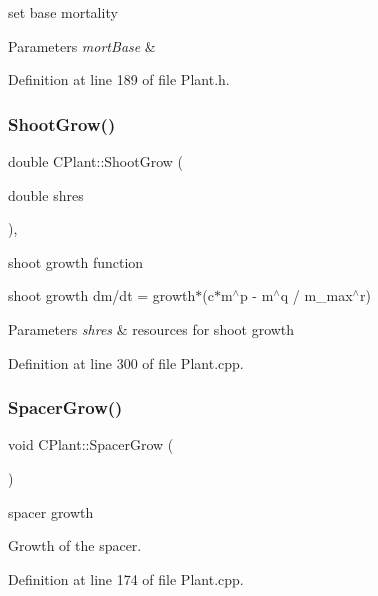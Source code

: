 set base mortality 
\begin{DoxyParams}{Parameters}
{\em mort\+Base} & \\
\hline
\end{DoxyParams}


Definition at line 189 of file Plant.\+h.

\mbox{\label{class_c_plant_a04fa48b79241a419192d035a3d28f839}} 
\subsubsection{\texorpdfstring{ShootGrow()}{ShootGrow()}}
{\footnotesize\ttfamily double C\+Plant\+::\+Shoot\+Grow (\begin{DoxyParamCaption}\item[{double}]{shres }\end{DoxyParamCaption})\hspace{0.3cm}{\ttfamily [protected]}, {\ttfamily [virtual]}}



shoot growth function 

shoot growth dm/dt = growth$\ast$(c$\ast$m$^\wedge$p -\/ m$^\wedge$q / m\+\_\+max$^\wedge$r) 
\begin{DoxyParams}{Parameters}
{\em shres} & resources for shoot growth \\
\hline
\end{DoxyParams}


Definition at line 300 of file Plant.\+cpp.

\mbox{\label{class_c_plant_abc8381f34cb7dd169a60d886ced465be}} 
\subsubsection{\texorpdfstring{SpacerGrow()}{SpacerGrow()}}
{\footnotesize\ttfamily void C\+Plant\+::\+Spacer\+Grow (\begin{DoxyParamCaption}{ }\end{DoxyParamCaption})}



spacer growth 

Growth of the spacer. 

Definition at line 174 of file Plant.\+cpp.

